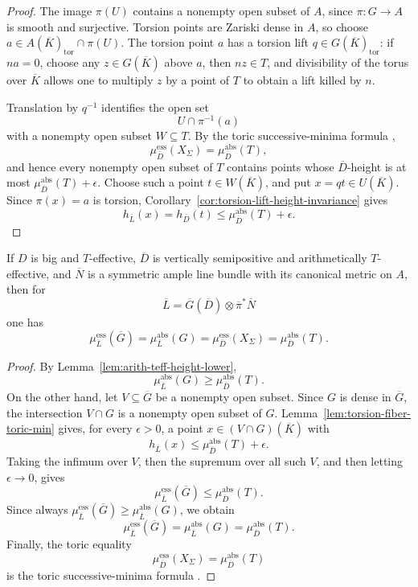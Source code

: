 \documentclass[10pt,a4paper]{amsart}
\theoremstyle{plain}
\theoremstyle{plain}
\numberwithin{equation}{section}
\providecommand{\bD}{\overline{D}}
\providecommand{\bL}{\overline{L}}
\providecommand{\bN}{\overline{N}}
\providecommand{\muess}{\mu^{\mathrm{ess}}}
\providecommand{\muabs}{\mu^{\mathrm{abs}}}
\begin{document}
\begin{proof}
	The image \(\pi(U)\) contains a nonempty open subset of \(A\), since
	\(\pi:G\to A\) is smooth and surjective.  Torsion points are Zariski dense in
	\(A\), so choose \(a\in A(\overline K)_{\operatorname{tor}}\cap \pi(U)\).  The
	torsion point \(a\) has a torsion lift
	\(q\in G(\overline K)_{\operatorname{tor}}\): if \(na=0\), choose any
	\(z\in G(\overline K)\) above \(a\), then \(nz\in T\), and divisibility of the
	torus over \(\overline K\) allows one to multiply \(z\) by a point of \(T\) to
	obtain a lift killed by \(n\).
	
	Translation by \(q^{-1}\) identifies the open set
	\[
	U\cap\pi^{-1}(a)
	\]
	with a nonempty open subset \(W\subseteq T\).  By the toric successive-minima
	formula \cite[Theorem 3.9 and Corollary 3.10]{BGPS15},
	\[
	\muess_{\bD}(X_\Sigma)=\muabs_{\bD}(T),
	\]
	and hence every nonempty open subset of \(T\) contains points whose
	\(\bD\)-height is at most \(\muabs_{\bD}(T)+\epsilon\).  Choose such a point
	\(t\in W(\overline K)\), and put \(x=qt\in U(\overline K)\).  Since
	\(\pi(x)=a\) is torsion, Corollary~\ref{cor:torsion-lift-height-invariance}
	gives
	\[
	h_{\bL}(x)=h_{\bD}(t)\le \muabs_{\bD}(T)+\epsilon.
	\]
\end{proof}

\begin{prop}\label{prop:section4-minima-formula}
	If \(D\) is big and \(T\)-effective, \(\bD\) is vertically semipositive and
	arithmetically \(T\)-effective, and \(\bN\) is a symmetric ample line bundle
	with its canonical metric on \(A\), then for
	\[
	\bL=\overline G(\bD)\otimes\overline\pi^*\bN
	\]
	one has
	\[
	\muess_{\bL}(\overline G)
	=
	\muabs_{\bL}(G)
	=
	\muess_{\bD}(X_\Sigma)
	=
	\muabs_{\bD}(T).
	\]
\end{prop}

\begin{proof}
	By Lemma~\ref{lem:arith-teff-height-lower},
	\[
	\muabs_{\bL}(G)\ge \muabs_{\bD}(T).
	\]
	On the other hand, let \(V\subseteq\overline G\) be a nonempty open subset.
	Since \(G\) is dense in \(\overline G\), the intersection \(V\cap G\) is a
	nonempty open subset of \(G\).  Lemma~\ref{lem:torsion-fiber-toric-min} gives,
	for every \(\epsilon>0\), a point \(x\in (V\cap G)(\overline K)\) with
	\[
	h_{\bL}(x)\le \muabs_{\bD}(T)+\epsilon.
	\]
	Taking the infimum over \(V\), then the supremum over all such \(V\), and then
	letting \(\epsilon\to0\), gives
	\[
	\muess_{\bL}(\overline G)\le \muabs_{\bD}(T).
	\]
	Since always \(\muess_{\bL}(\overline G)\ge\muabs_{\bL}(G)\), we obtain
	\[
	\muess_{\bL}(\overline G)=\muabs_{\bL}(G)=\muabs_{\bD}(T).
	\]
	Finally, the toric equality
	\[
	\muess_{\bD}(X_\Sigma)=\muabs_{\bD}(T)
	\]
	is the toric successive-minima formula
	\cite[Theorem 3.9 and Corollary 3.10]{BGPS15}.
\end{proof}
\end{document}
